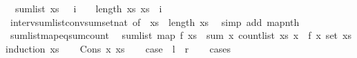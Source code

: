 \begin{isabellebody}
\ \ {\isachardoublequoteopen}sum{\isacharunderscore}{\kern0pt}list\ xs\ {\isacharequal}{\kern0pt}\ {\isacharparenleft}{\kern0pt}{\isasymSum}\ i\ {\isacharequal}{\kern0pt}\ {}\ {\isachardot}{\kern0pt}{\isachardot}{\kern0pt}{\isacharless}{\kern0pt}\ length\ xs{\isachardot}{\kern0pt}\ xs\ {\isacharbang}{\kern0pt}\ i{\isacharparenright}{\kern0pt}{\isachardoublequoteclose}\isanewline
%
\isadelimproof
\ \ %
\endisadelimproof
%
\isatagproof
{}\isamarkupfalse%
\ interv{\isacharunderscore}{\kern0pt}sum{\isacharunderscore}{\kern0pt}list{\isacharunderscore}{\kern0pt}conv{\isacharunderscore}{\kern0pt}sum{\isacharunderscore}{\kern0pt}set{\isacharunderscore}{\kern0pt}nat\ {\isacharbrackleft}{\kern0pt}of\ {\isachardoublequoteopen}{\isacharparenleft}{\kern0pt}{\isacharbang}{\kern0pt}{\isacharparenright}{\kern0pt}\ xs{\isachardoublequoteclose}\ {}\ {\isachardoublequoteopen}length\ xs{\isachardoublequoteclose}{\isacharbrackright}{\kern0pt}\ \isamarkupfalse%
\ {\isacharparenleft}{\kern0pt}simp\ add{\isacharcolon}{\kern0pt}\ map{\isacharunderscore}{\kern0pt}nth{\isacharparenright}{\kern0pt}%
\endisatagproof
{\isafoldproof}%
%
\isadelimproof
\isanewline
%
\endisadelimproof
\isanewline
{}\isamarkupfalse%
\ sum{\isacharunderscore}{\kern0pt}list{\isacharunderscore}{\kern0pt}map{\isacharunderscore}{\kern0pt}eq{\isacharunderscore}{\kern0pt}sum{\isacharunderscore}{\kern0pt}count{\isacharcolon}{\kern0pt}\isanewline
\ \ {\isachardoublequoteopen}sum{\isacharunderscore}{\kern0pt}list\ {\isacharparenleft}{\kern0pt}map\ f\ xs{\isacharparenright}{\kern0pt}\ {\isacharequal}{\kern0pt}\ sum\ {\isacharparenleft}{\kern0pt}{\isasymlambda}x{\isachardot}{\kern0pt}\ count{\isacharunderscore}{\kern0pt}list\ xs\ x\ {\isacharasterisk}{\kern0pt}\ f\ x{\isacharparenright}{\kern0pt}\ {\isacharparenleft}{\kern0pt}set\ xs{\isacharparenright}{\kern0pt}{\isachardoublequoteclose}\isanewline
%
\isadelimproof
%
\endisadelimproof
%
\isatagproof
{}\isamarkupfalse%
{\isacharparenleft}{\kern0pt}induction\ xs{\isacharparenright}{\kern0pt}\isanewline
\ \ \isamarkupfalse%
\ {\isacharparenleft}{\kern0pt}Cons\ x\ xs{\isacharparenright}{\kern0pt}\isanewline
\ \ \isamarkupfalse%
\ {\isacharquery}{\kern0pt}case\ {\isacharparenleft}{\kern0pt}\ {\isachardoublequoteopen}{\isacharquery}{\kern0pt}l\ {\isacharequal}{\kern0pt}\ {\isacharquery}{\kern0pt}r{\isachardoublequoteclose}{\isacharparenright}{\kern0pt}\isanewline
\ \ \isamarkupfalse%
\ cases\isanewline
\ \ \ \ \isamarkupfalse%

\end{isabellebody}
